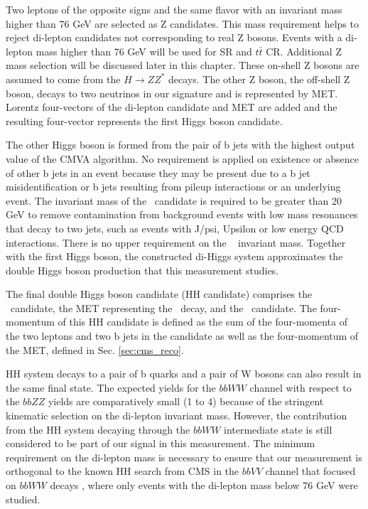 Two leptons of the opposite signs and the same flavor with an invariant mass higher than 76 GeV are selected as Z candidates. This mass requirement helps to reject di-lepton candidates not corresponding to real Z bosons. Events with a di-lepton mass higher than 76 GeV will be used for SR and $t\bar{t}$ CR. Additional Z mass selection will be discussed later in this chapter. These on-shell Z bosons are assumed to come from the $H \to Z Z^*$ decays. The other Z boson, the off-shell Z boson, decays to two neutrinos in our signature and is represented by MET. Lorentz four-vectors of the di-lepton candidate and MET are added and the resulting four-vector represents the first Higgs boson candidate. 

The other Higgs boson is formed from the pair of b jets with the highest output value of the CMVA algorithm. No requirement is applied on existence or absence of other b jets in an event because they may be present due to a b jet misidentification or b jets resulting from pileup interactions or an underlying event. The invariant mass of the \HBB~candidate is required to be greater than 20 GeV to remove contamination from background events with low mass resonances that decay to two jets, such as events with J/psi, Upsilon or low energy QCD interactions. There is no upper requirement on the \HBB~ invariant mass. Together with the first Higgs boson, the constructed di-Higgs system approximates the double Higgs boson production that this measurement studies. 

The final double Higgs boson candidate (HH candidate) comprises the \Zll~candidate, the MET representing the \Znn~decay, and the \HBB~candidate. The four-momentum of this HH candidate is defined as the sum of the four-momenta of the two leptons and two b jets in the candidate as well as the four-momentum of the MET, defined in Sec. \ref{sec:cms_reco}.

HH system decays to a pair of b quarks and a pair of W bosons can also result in the same final state. The expected yields for the $bbWW$ channel with respect to the $bbZZ$ yields are comparatively small (1 to 4) because of the stringent kinematic selection on the di-lepton invariant mass. However, the contribution from the HH system decaying through the $bbWW$ intermediate state is still considered to be part of our signal in this measurement. The minimum requirement on the di-lepton mass is necessary to ensure that our measurement is orthogonal to the known HH search from CMS in the $bbVV$ channel that focused on $bbWW$ decays \cite{bbWW}, where only events with the di-lepton mass below 76 GeV were studied.

